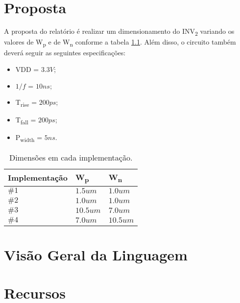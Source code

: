 \documentclass{iiufrgs}
\begin{document}
\chapter{Proposta}\label{proposta}
A proposta do relatório é realizar um dimensionamento do INV\textsubscript{2} variando os valores de W\textsubscript{p} e de W\textsubscript{n} conforme a tabela \ref{tab:imp}.
Além disso, o circuito também deverá seguir as seguintes especificações:

\begin{itemize}[noitemsep]
    \setlength{\itemindent}{1em}
    \item[] VDD = $3.3 V$;
    \item[] $1/f$ = $10ns$;
    \item[] T\textsubscript{rise} = $200ps$;
    \item[] T\textsubscript{fall} = $200ps$;
    \item[] P\textsubscript{width} = $5ns$.
\end{itemize}

\begin{table}[ht]
    \centering
    \caption{Dimensões em cada implementação.}
    \label{tab:imp}
    \begin{tabular}{l|l|l}
        Implementação
        & W\textsubscript{p} 
        & W\textsubscript{n} \\ \hline
        $\#1$ & $1.5 um$ & $1.0 um$ \\ \hline
        $\#2$ & $1.0 um$ & $1.0 um$ \\ \hline
        $\#3$ & $10.5 um$ & $7.0 um$ \\ \hline
        $\#4$ & $7.0 um$ & $10.5 um$ \\ \hline
    \end{tabular}
\end{table}

\chapter{Visão Geral da Linguagem}\label{visao}

\chapter{Recursos}\label{recursos} %

\end{document}
